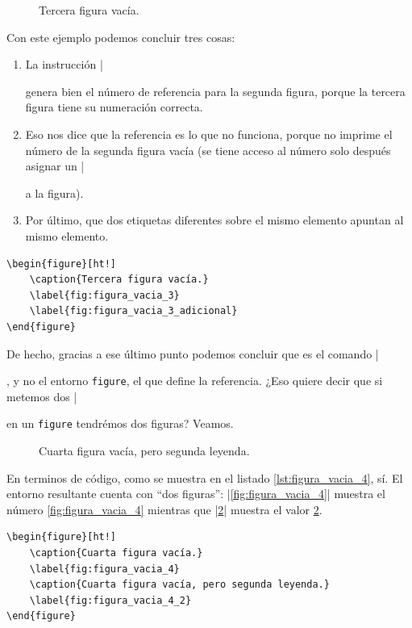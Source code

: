 \begin{figure}[ht!]
	\caption{Tercera figura vacía.}
	\label{fig:figura_vacia_3}
	\label{fig:figura_vacia_3_adicional}
\end{figure}

Con este ejemplo podemos concluir tres cosas:
\begin{enumerate}
	\item La instrucción |\caption| genera bien el número de referencia para la segunda figura, porque la tercera figura tiene su numeración correcta.
	\item Eso nos dice que la referencia es lo que no funciona, porque no imprime el número de la segunda figura vacía (se tiene acceso al número solo después asignar un |\caption| a la figura).
	\item Por último, que dos etiquetas diferentes sobre el mismo elemento apuntan al mismo elemento.
\end{enumerate}

\begin{lstlisting}[style=latex,caption=Código para la tercera figura vacía.,label=lst:figura_vacia_3]
\begin{figure}[ht!]
	\caption{Tercera figura vacía.}
	\label{fig:figura_vacia_3}
	\label{fig:figura_vacia_3_adicional}
\end{figure}
\end{lstlisting}

De hecho, gracias a ese último punto podemos concluir que es el comando |\caption|, y no el entorno \texttt{figure}, el que define la referencia. ¿Eso quiere decir que si metemos dos |\caption| en un \texttt{figure} tendrémos dos figuras? Veamos.\newline

\begin{figure}[ht!]
	\caption{Cuarta figura vacía.}
	\label{fig:figura_vacia_4}
	\caption{Cuarta figura vacía, pero segunda leyenda.}
	\label{fig:figura_vacia_4_2}
\end{figure}

En terminos de código, como se muestra en el listado \ref{lst:figura_vacia_4}, sí. El entorno resultante cuenta con ``dos figuras'': |\ref{fig:figura_vacia_4}| muestra el número \ref{fig:figura_vacia_4} mientras que |\ref{fig:figura_vacia_4_2}| muestra el valor \ref{fig:figura_vacia_4_2}.

\begin{lstlisting}[style=latex,caption=Código para la cuarta figura vacía.,label=lst:figura_vacia_4]
\begin{figure}[ht!]
	\caption{Cuarta figura vacía.}
	\label{fig:figura_vacia_4}
	\caption{Cuarta figura vacía, pero segunda leyenda.}
	\label{fig:figura_vacia_4_2}
\end{figure}
\end{lstlisting}

